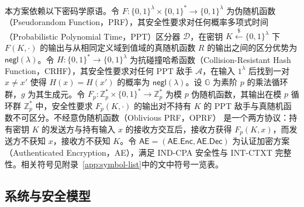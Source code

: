本方案依赖以下密码学原语。令 $F:\{0,1\}^\lambda\times\{0,1\}^*\to\{0,1\}^\lambda$ 为伪随机函数（Pseudorandom Function，PRF）\cite{10.1145/6490.6503,katz2020introduction}，其安全性要求对任何概率多项式时间（Probabilistic Polynomial Time，PPT）区分器 $\mathcal{D}$，在密钥 $K\overset{\$}{\leftarrow}\{0,1\}^\lambda$ 下 $F(K,\cdot)$ 的输出与从相同定义域到值域的真随机函数 $R$ 的输出之间的区分优势为 $\mathsf{negl}(\lambda)$。令 $H:\{0,1\}^*\to\{0,1\}^\lambda$ 为抗碰撞哈希函数（Collision-Resistant Hash Function，CRHF）\cite{katz2020introduction}，其安全性要求对任何 PPT 敌手 $\mathcal{A}$，在输入 $1^\lambda$ 后找到一对 $x\neq x'$ 使得 $H(x)=H(x')$ 的概率为 $\mathsf{negl}(\lambda)$。设 $\mathbb{G}$ 为素阶 $p$ 的乘法循环群，$g$ 为其生成元。令 $F_p:\mathbb{Z}_p^*\times\{0,1\}^*\to\mathbb{Z}_p^*$ 为模 $p$ 伪随机函数，其输出在模 $p$ 循环群 $\mathbb{Z}_p^*$ 中，安全性要求 $F_p(K,\cdot)$ 的输出对不持有 $K$ 的 PPT 敌手与真随机函数不可区分。不经意伪随机函数（Oblivious PRF，OPRF）\cite{10.1007/978-3-540-30576-7_17,jarecki2009efficient} 是一个两方协议：持有密钥 $K$ 的发送方与持有输入 $x$ 的接收方交互后，接收方获得 $F_p(K,x)$，而发送方不获知 $x$，接收方不获知 $K$。令 $\mathsf{AE}=(\mathsf{AE.Enc},\mathsf{AE.Dec})$ 为认证加密方案（Authenticated Encryption，AE），满足 IND-CPA 安全性与 INT-CTXT 完整性\cite{katz2020introduction,bellare2000authenticated,10.1007/11761679_23}。相关符号见附录~\ref{app:symbol-list}中的文中符号一览表。

\subsection{系统与安全模型}\label{sec:model-security}

